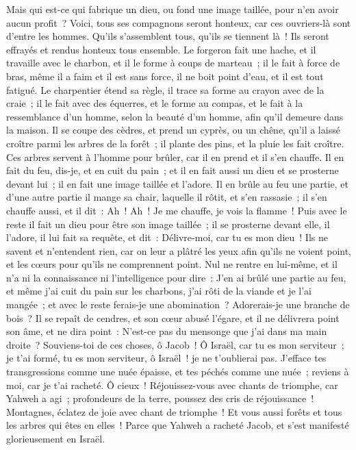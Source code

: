 \begin{multicols}{2}
Mais qui est-ce qui fabrique un dieu, ou fond une image taillée, pour n'en avoir aucun profit~?
Voici, tous ses compagnons seront honteux, car ces ouvriers-là sont d'entre les hommes. Qu'ils s'assemblent tous, qu'ils se tiennent là~! Ils seront effrayés et rendus honteux tous ensemble.
Le forgeron fait une hache, et il travaille avec le charbon, et il le forme à coups de marteau~; il le fait à force de bras, même il a faim et il est sans force, il ne boit point d'eau, et il est tout fatigué.
Le charpentier étend sa règle, il trace sa forme au crayon avec de la craie~; il le fait avec des équerres, et le forme au compas, et le fait à la ressemblance d'un homme, selon la beauté d'un homme, afin qu'il demeure dans la maison.
Il se coupe des cèdres, et prend un cyprès, ou un chêne, qu'il a laissé croître parmi les arbres de la forêt~; il plante des pins, et la pluie les fait croître.
Ces arbres servent à l'homme pour brûler, car il en prend et il s'en chauffe. Il en fait du feu, dis-je, et en cuit du pain~; et il en fait aussi un dieu et se prosterne devant lui~; il en fait une image taillée et l'adore.
Il en brûle au feu une partie, et d'une autre partie il mange sa chair, laquelle il rôtit, et s'en rassasie~; il s'en chauffe aussi, et il dit~: Ah~! Ah~! Je me chauffe, je vois la flamme~!
Puis avec le reste il fait un dieu pour être son image taillée~; il se prosterne devant elle, il l'adore, il lui fait sa requête, et dit~: Délivre-moi, car tu es mon dieu~!
Ils ne savent et n'entendent rien, car on leur a plâtré les yeux afin qu'ils ne voient point, et les cœurs pour qu'ils ne comprennent point.
Nul ne rentre en lui-même, et il n'a ni la connaissance ni l'intelligence pour dire~: J'en ai brûlé une partie au feu, et même j'ai cuit du pain sur les charbons, j'ai rôti de la viande et je l'ai mangée~; et avec le reste ferais-je une abomination~? Adorerais-je une branche de bois~?
Il se repaît de cendres, et son cœur abusé l'égare, et il ne délivrera point son âme, et ne dira point~: N'est-ce pas du mensonge que j'ai dans ma main droite~?
Souviens-toi de ces choses, ô Jacob~! Ô Israël, car tu es mon serviteur~; je t'ai formé, tu es mon serviteur, ô Israël~! je ne t'oublierai pas.
J'efface tes transgressions comme une nuée épaisse, et tes péchés comme une nuée~; reviens à moi, car je t'ai racheté.
Ô cieux~! Réjouissez-vous avec chants de triomphe, car Yahweh a agi~; profondeurs de la terre, poussez des cris de réjouissance~! Montagnes, éclatez de joie avec chant de triomphe~! Et vous aussi forêts et tous les arbres qui êtes en elles~! Parce que Yahweh a racheté Jacob, et s'est manifesté glorieusement en Israël.

\end{multicols}
